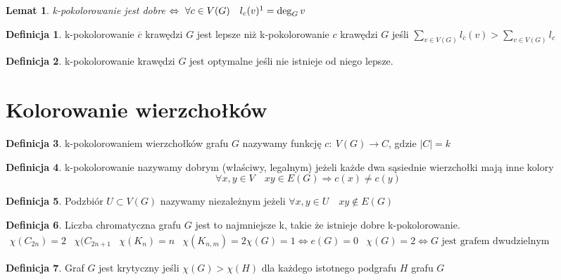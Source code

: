 \documentclass[12pt,a4paper]{article}
\newtheorem{lemat}{Lemat}
\theoremstyle{definition}
\newtheorem{df}{Definicja}
\begin{document}
\begin{lemat}
k-pokolorowanie jest dobre $\Leftrightarrow ~ \forall c\in V(G) \quad l_c(v)\footnote{\text{liczba kolorów użytych do pokolorowanie krawędzi incydentnych z }v} = \deg_Gv$
\end{lemat}
\begin{df}
k-pokolorowanie $\overline{c}$ krawędzi $G$ jest lepsze niż k-pokolorowanie $c$ krawędzi $G$ jeśli
$\sum\limits_{v\in V(G)}l_{\overline{c}}(v) > \sum\limits_{v\in V(G)}l_c $
\end{df}
\begin{df}
k-pokolorowanie krawędzi $G$ jest optymalne jeśli nie istnieje od niego lepsze.
\end{df}


\section{Kolorowanie wierzchołków}
\begin{df}
k-pokolorowaniem wierzchołków grafu $G$ nazywamy funkcję $c:~V(G)\to C$, gdzie $|C|=k$
\end{df}

\begin{df}
k-pokolorowanie nazywamy dobrym (właściwy, legalnym) jeżeli każde dwa sąsiednie wierzchołki mają inne kolory
$$ \forall x,y \in V \quad xy\in E(G) \Rightarrow c(x) \neq c(y) $$
\end{df}

\begin{df}
Podzbiór $U\subset V(G)$ nazywamy niezależnym jeżeli $\forall x,y \in U \quad xy\not\in E(G)$
\end{df}

\begin{df}
Liczba chromatyczna grafu $G$ jest to najmniejsze k, takie że istnieje dobre k-pokolorowanie.\\
$\begin{matrix}
\chi(C_{2n}) = 2 & \chi(C_{2n+1} & \chi(K_n) = n & \chi(K_{n,m}) = 2 
\chi(G) = 1 \Leftrightarrow e(G) = 0 & \chi(G) = 2 \Leftrightarrow G\text{ jest grafem dwudzielnym}
\end{matrix}$
\end{df}

\begin{df}
Graf $G$ jest krytyczny jeśli $\chi(G) > \chi(H)$ dla każdego istotnego podgrafu $H$ grafu $G$
\end{df}
\end{document}
